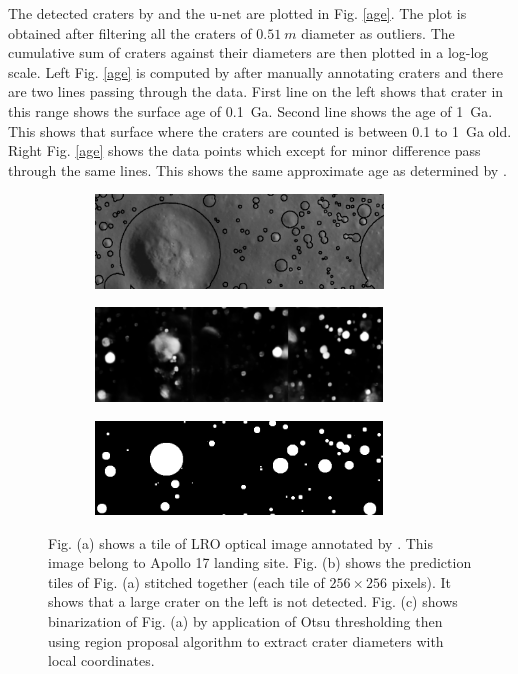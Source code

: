 \documentclass[11pt]{article}
\begin{document}
The detected craters by \cite{dino2020} and the u-net are plotted in Fig. \ref{age}. The plot is obtained after filtering all the craters of $\SI{0.51}{m}$ diameter as outliers. The cumulative sum of craters against their diameters are then plotted in a log-log scale. Left Fig. \ref{age} is computed by \cite{dino2020} after manually annotating craters and there are two lines passing through the data. First line on the left shows that crater in this range shows the surface age of \SI{0.1}{Ga}. Second line shows the age of \SI{1}{Ga}. This shows that surface where the craters are counted is between 0.1 to \SI{1}{Ga} old. Right Fig. \ref{age} shows the data points which except for minor difference pass through the same lines. This shows the same approximate age as determined by \cite{dino2020}.


\begin{figure}[H]
	\begin{subfigure}{\linewidth}
		\centering
		\includegraphics[width=8cm, height=2.5cm]{files/results/dino_marking.png}
		\caption{}
	\end{subfigure}\par\medskip
	\begin{subfigure}{\linewidth}
		\centering
		\includegraphics[width=8cm, height=2.5cm]{files/results/exp.png}\hfill
		\caption{}
	\end{subfigure}\par\medskip
	\begin{subfigure}{\linewidth}
		\centering
		\includegraphics[width=8cm, height=2.5cm]{files/results/otsu_projection.png}\hfill
		\caption{}
	\end{subfigure}
	\caption{Fig. (a) shows a tile of LRO optical image annotated by \cite{dino2020}. This image belong to Apollo 17 landing site. Fig. (b) shows the prediction tiles of Fig. (a) stitched together (each tile of $256 \times 256$ pixels). It shows that a large crater on the left is not detected. Fig. (c) shows binarization of Fig. (a) by application of Otsu thresholding then using region proposal algorithm to extract crater diameters with local coordinates.}
	\label{bigcrater}
\end{figure}
\end{document}

